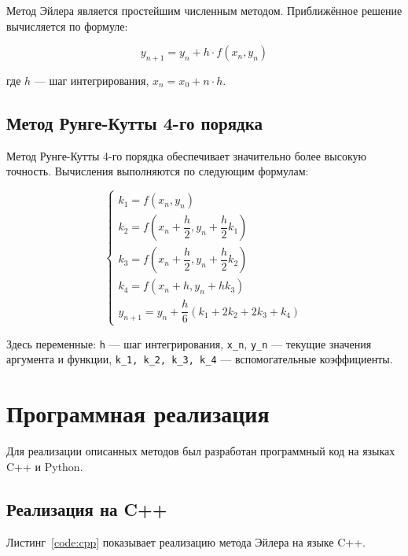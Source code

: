 \documentclass{SCWorks}
\begin{document}
	Метод Эйлера является простейшим численным методом. Приближённое решение вычисляется по формуле:
	
	\begin{equation}
		y_{n+1} = y_n + h \cdot f(x_n, y_n)
		\label{eq:euler}
	\end{equation}
	
	где \( h \) — шаг интегрирования, \( x_n = x_0 + n \cdot h \).
	
	\subsection{Метод Рунге-Кутты 4-го порядка}
	
	Метод Рунге-Кутты 4-го порядка обеспечивает значительно более высокую точность. Вычисления выполняются по следующим формулам:
	
	\begin{equation}
		\begin{cases}
			k_1 = f(x_n, y_n) \\[4pt]
			k_2 = f\left(x_n + \dfrac{h}{2}, y_n + \dfrac{h}{2}k_1\right) \\[8pt]
			k_3 = f\left(x_n + \dfrac{h}{2}, y_n + \dfrac{h}{2}k_2\right) \\[8pt]
			k_4 = f\left(x_n + h, y_n + h k_3\right) \\[8pt]
			y_{n+1} = y_n + \dfrac{h}{6}(k_1 + 2k_2 + 2k_3 + k_4)
		\end{cases}
		\label{eq:rungekutta}
	\end{equation}
	
	Здесь переменные:
	\verb|h| — шаг интегрирования,
	\verb|x_n|, \verb|y_n| — текущие значения аргумента и функции,
	\verb|k_1, k_2, k_3, k_4| — вспомогательные коэффициенты.
	
	\section{Программная реализация}
	
	Для реализации описанных методов был разработан программный код на языках C++ и Python.
	
	\subsection{Реализация на C++}
	
	Листинг~\ref{code:cpp} показывает реализацию метода Эйлера на языке C++.
	
	\inputminted[firstline=1,lastline=25]{cpp}{code/codik_pupu.cpp}
	\label{code:cpp}
	
\end{document}
